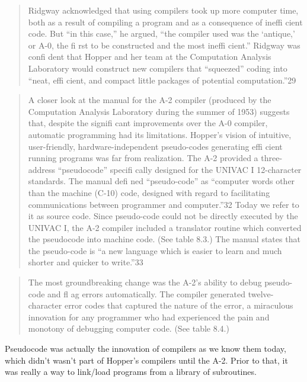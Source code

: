 \begin{quotation}
Ridgway acknowledged that using compilers took up more
computer time, both as a result of compiling a program and as
a consequence of ineffi cient code. But “in this case,” he argued,
“the compiler used was the ‘antique,’ or A-0, the fi rst to be
constructed and the most ineffi cient.” Ridgway was confi dent
that Hopper and her team at the Computation Analysis Laboratory would construct new compilers that “squeezed” coding
into “neat, effi cient, and compact little packages of potential
computation.”29
\end{quotation}

\begin{quotation}
A closer look at the manual for the A-2 compiler (produced
by the Computation Analysis Laboratory during the summer of
1953) suggests that, despite the signifi cant improvements over
the A-0 compiler, automatic programming had its limitations.
Hopper’s vision of intuitive, user-friendly, hardware-independent
pseudo-codes generating effi cient running programs was far
from realization. The A-2 provided a three-address “pseudocode” specifi cally designed for the UNIVAC I 12-character standards. The manual defi ned “pseudo-code” as “computer words
other than the machine (C-10) code, designed with regard to
facilitating communications between programmer and computer.”32 Today we refer to it as source code. Since pseudo-code
could not be directly executed by the UNIVAC I, the A-2 compiler included a translator routine which converted the pseudocode into machine code. (See table 8.3.)
The manual states that the pseudo-code is “a new language
which is easier to learn and much shorter and quicker to write.”33
\end{quotation}

\begin{quotation}
 The most groundbreaking change was the A-2's ability to debug
pseudo-code and fl ag errors automatically. The compiler generated twelve-character error codes that captured the nature of the
error, a miraculous innovation for any programmer who had
experienced the pain and monotony of debugging computer
code. (See table 8.4.)
\end{quotation}

Pseudocode was actually the innovation of compilers as we know them today,
which didn't wasn't part of Hopper's compilers until the A-2.
Prior to that, it was really a way to link/load programs from a library of subroutines.

